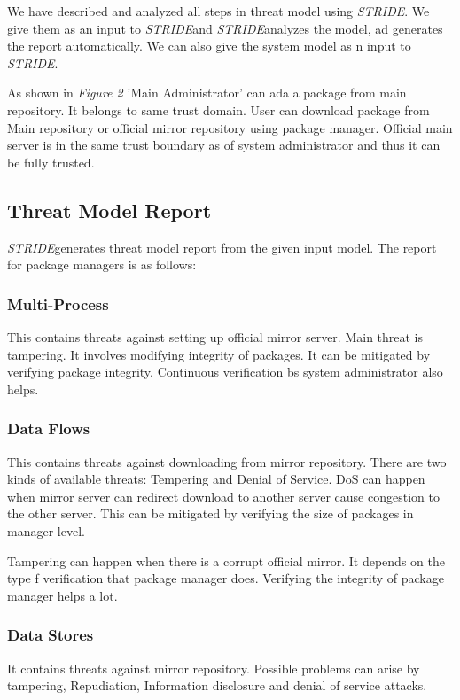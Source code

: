 \documentclass{IEEEtran}
\newcommand{\stride}{\emph{STRIDE}}
\begin{document}
We have described and analyzed all steps in threat model using \stride. We give them as an input to \stride and \stride analyzes the model, ad generates the report automatically. We can also give the system model as n input to \stride. 

As shown in \emph{Figure 2} 'Main Administrator' can ada a package from main repository. It belongs to same trust domain. User can download package from Main repository or official mirror repository using package manager. Official main server is in the same trust boundary as of system administrator and thus it can be fully trusted.

\subsection{Threat Model Report}
\stride generates threat model report from the given input model. The report for package managers is as follows:

\subsubsection{Multi-Process}
This contains threats against setting up official mirror server. Main threat is tampering. It involves modifying integrity of packages.
It can be mitigated by verifying package integrity. Continuous verification bs system administrator also helps. 

\subsubsection{Data Flows}
This contains threats against downloading from mirror repository. There are two kinds of available threats: Tempering and Denial of Service. DoS can happen when mirror server can redirect download to another server cause congestion to the other server. This can be mitigated by verifying the size of packages in manager level. 

Tampering can happen when there is a corrupt official mirror. It depends on the type f verification that package manager does. Verifying the integrity of package manager helps a lot.

\subsubsection{Data Stores}
It contains threats against mirror repository. Possible problems can arise by tampering, Repudiation, Information disclosure and denial of service attacks.
\end{document}

